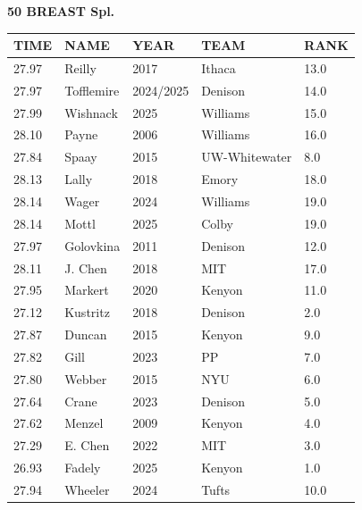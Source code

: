 \begin{table}[H]
\centering
\begin{minipage}[t]{0.6\textwidth}
\centering
\textbf{50 BREAST Spl.}\\[0.1cm]
\begin{tabular}{@{}p{1.8cm}p{2.8cm}p{1.2cm}p{1.4cm}p{0.8cm}@{}}
\hline
    \textbf{TIME} & \textbf{NAME} & \textbf{YEAR} & \textbf{TEAM} & \textbf{RANK} \\
\hline
    27.97 & Reilly & 2017 & Ithaca & 13.0 \\
    27.97 & Tofflemire & 2024/2025 & Denison & 14.0 \\
    27.99 & Wishnack & 2025 & Williams & 15.0 \\
    28.10 & Payne & 2006 & Williams & 16.0 \\
    27.84 & Spaay & 2015 & UW-Whitewater & 8.0 \\
    28.13 & Lally & 2018 & Emory & 18.0 \\
    28.14 & Wager & 2024 & Williams & 19.0 \\
    28.14 & Mottl & 2025 & Colby & 19.0 \\
    27.97 & Golovkina & 2011 & Denison & 12.0 \\
    28.11 & J. Chen & 2018 & MIT & 17.0 \\
    27.95 & Markert & 2020 & Kenyon & 11.0 \\
    27.12 & Kustritz & 2018 & Denison & 2.0 \\
    27.87 & Duncan & 2015 & Kenyon & 9.0 \\
    27.82 & Gill & 2023 & PP & 7.0 \\
    27.80 & Webber & 2015 & NYU & 6.0 \\
    27.64 & Crane & 2023 & Denison & 5.0 \\
    27.62 & Menzel & 2009 & Kenyon & 4.0 \\
    27.29 & E. Chen & 2022 & MIT & 3.0 \\
    26.93 & Fadely & 2025 & Kenyon & 1.0 \\
    27.94 & Wheeler & 2024 & Tufts & 10.0 \\
\hline
\end{tabular}
\end{minipage}
\end{table}


